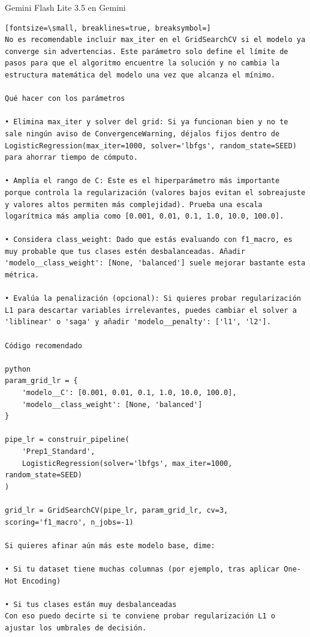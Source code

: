 \documentclass[12pt,a4paper,oneside]{book}
\begin{document}
\begin{iaresp}{Gemini Flash Lite 3.5 en Gemini}
\begin{Verbatim}[fontsize=\small, breaklines=true, breaksymbol=]
No es recomendable incluir max_iter en el GridSearchCV si el modelo ya converge sin advertencias. Este parámetro solo define el límite de pasos para que el algoritmo encuentre la solución y no cambia la estructura matemática del modelo una vez que alcanza el mínimo.

Qué hacer con los parámetros

• Elimina max_iter y solver del grid: Si ya funcionan bien y no te sale ningún aviso de ConvergenceWarning, déjalos fijos dentro de LogisticRegression(max_iter=1000, solver='lbfgs', random_state=SEED) para ahorrar tiempo de cómputo.

• Amplía el rango de C: Este es el hiperparámetro más importante porque controla la regularización (valores bajos evitan el sobreajuste y valores altos permiten más complejidad). Prueba una escala logarítmica más amplia como [0.001, 0.01, 0.1, 1.0, 10.0, 100.0].

• Considera class_weight: Dado que estás evaluando con f1_macro, es muy probable que tus clases estén desbalanceadas. Añadir 'modelo__class_weight': [None, 'balanced'] suele mejorar bastante esta métrica.

• Evalúa la penalización (opcional): Si quieres probar regularización L1 para descartar variables irrelevantes, puedes cambiar el solver a 'liblinear' o 'saga' y añadir 'modelo__penalty': ['l1', 'l2'].

Código recomendado

python
param_grid_lr = {
    'modelo__C': [0.001, 0.01, 0.1, 1.0, 10.0, 100.0],
    'modelo__class_weight': [None, 'balanced']
}

pipe_lr = construir_pipeline(
    'Prep1_Standard', 
    LogisticRegression(solver='lbfgs', max_iter=1000, random_state=SEED)
)

grid_lr = GridSearchCV(pipe_lr, param_grid_lr, cv=3, scoring='f1_macro', n_jobs=-1)

Si quieres afinar aún más este modelo base, dime:

• Si tu dataset tiene muchas columnas (por ejemplo, tras aplicar One-Hot Encoding)

• Si tus clases están muy desbalanceadas
Con eso puedo decirte si te conviene probar regularización L1 o ajustar los umbrales de decisión.
\end{Verbatim}
\end{iaresp}
\end{document}

